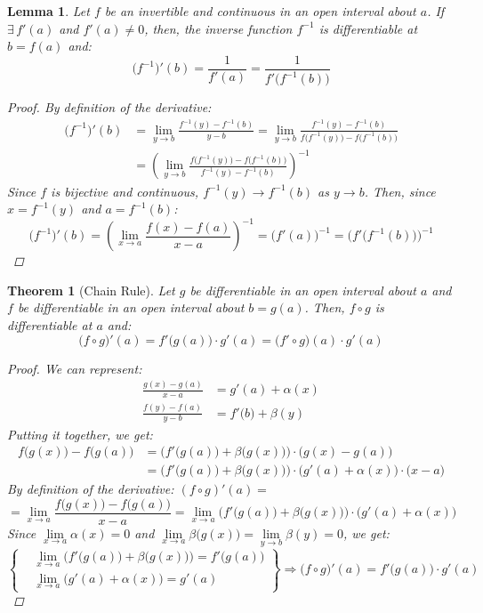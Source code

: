 \documentclass[12pt]{article}
\let\RA\Rightarrow
\newtheorem{theorem}{Theorem}[subsection]
\newtheorem{lemma}{Lemma}[subsection]
\begin{document}
\begin{lemma}
  Let $f$ be an invertible and continuous in an open interval about $a$. If $\exists\,f'(a)$ and $f'(a)\neq 0$, then, the inverse function $f^{-1}$ is differentiable at $b=f(a)$ and:
  $$\big(f^{-1}\big)'(b)=\frac{1}{f'(a)}=\frac{1}{f'\big(f^{-1}(b)\big)}$$
  \begin{proof}
    By definition of the derivative:
    \begin{align*}
      \big(f^{-1}\big)'(b)&=\lim_{y\to b}\frac{f^{-1}(y)-f^{-1}(b)}{y-b}=\lim_{y\to b}\frac{f^{-1}(y)-f^{-1}(b)}{f\big(f^{-1}(y)\big)-f\big(f^{-1}(b)\big)} \\
      &=\left(\lim_{y\to b}\frac{f\big(f^{-1}(y)\big)-f\big(f^{-1}(b)\big)}{f^{-1}(y)-f^{-1}(b)}\right)^{-1}
    \end{align*}
    Since $f$ is bijective and continuous, $f^{-1}(y)\to f^{-1}(b)$ as $y\to b$. Then, since $x=f^{-1}(y)$ and $a=f^{-1}(b)$: $$\big(f^{-1}\big)'(b)=\left(\lim_{x\to a}\frac{f(x)-f(a)}{x-a}\right)^{-1}=\Big(f'(a)\Big)^{-1}=\Big(f'\big(f^{-1}(b)\big)\Big)^{-1}$$
  \end{proof}
\end{lemma}

\begin{theorem}[Chain Rule]
  Let $g$ be differentiable in an open interval about $a$ and $f$ be differentiable in an open interval about $b=g(a)$. Then, $f\circ g$ is differentiable at $a$ and:
  $$\big(f\circ g\big)'(a)=f'\big(g(a)\big)\cdot g'(a)=\big(f'\circ g\big)(a)\cdot g'(a)$$
  \begin{proof}
    We can represent:
    \begin{align*}
      \frac{g(x)-g(a)}{x-a}&=g'(a)+\alpha(x)\\
      \frac{f(y)-f(a)}{y-b}&=f'\big(b\big)+\beta(y)
    \end{align*}
    Putting it together, we get:
    \begin{align*}
      f\big(g(x)\big)-f\big(g(a)\big)&=\Big(f'\big(g(a)\big)+\beta\big(g(x)\big)\Big)\cdot\Big(g(x)-g(a)\Big)\\
      &=\Big(f'\big(g(a)\big)+\beta\big(g(x)\big)\Big)\cdot\Big(g'(a)+\alpha(x)\Big)\cdot\big(x-a\big)
    \end{align*}
    By definition of the derivative: $(f\circ g)'(a)=$ $$=\lim_{x\to a}\frac{f\big(g(x)\big)-f\big(g(a)\big)}{x-a}=\lim_{x\to a}\Big(f'\big(g(a)\big)+\beta\big(g(x)\big)\Big)\cdot\Big(g'(a)+\alpha(x)\Big)$$
    Since $\lim\limits_{x\to a}\alpha(x)=0$ and $\lim\limits_{x\to a}\beta\big(g(x)\big)=\lim\limits_{y\to b}\beta(y)=0$, we get:
    $$
    \left\{\begin{aligned}
      &\lim\limits_{x\to a}\Big(f'\big(g(a)\big)+\beta\big(g(x)\big)\Big)=f'\big(g(a)\big)\\
      &\lim\limits_{x\to a}\Big(g'(a)+\alpha(x)\Big)=g'(a)
    \end{aligned}\right\}
    \RA \big(f\circ g\big)'(a)=f'\big(g(a)\big)\cdot g'(a)
    $$
  \end{proof}
\end{theorem}
\end{document}
